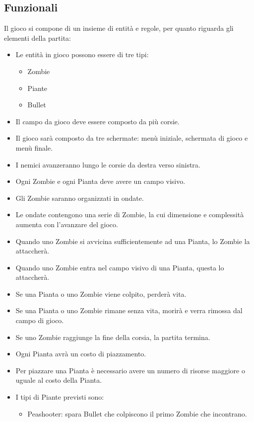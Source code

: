 \subsection{Funzionali}
Il gioco si compone di un insieme di entità e regole, per quanto riguarda gli elementi della partita:
\begin{itemize}
    \item Le entità in gioco possono essere di tre tipi:
    \begin{itemize}
        \item Zombie
        \item Piante
        \item Bullet
    \end{itemize}
    \item Il campo da gioco deve essere composto da più corsie.
    \item Il gioco sarà composto da tre schermate: menù iniziale, schermata di gioco e menù finale.
    \item I nemici avanzeranno lungo le corsie da destra verso sinistra.
    \item Ogni Zombie e ogni Pianta deve avere un campo visivo.
    \item Gli Zombie saranno organizzati in ondate.
    \item Le ondate contengono una serie di Zombie, la cui dimensione e complessità aumenta con l'avanzare del gioco.
    \item Quando uno Zombie si avvicina sufficientemente ad una Pianta, lo Zombie la attaccherà.
    \item Quando uno Zombie entra nel campo visivo di una Pianta, questa lo attaccherà.
    \item Se una Pianta o uno Zombie viene colpito, perderà vita.
    \item Se una Pianta o uno Zombie rimane senza vita, morirà e verra rimossa dal campo di gioco.
    \item Se uno Zombie raggiunge la fine della corsia, la partita termina.
    \item Ogni Pianta avrà un costo di piazzamento.
    \item Per piazzare una Pianta è necessario avere un numero di risorse maggiore o uguale al costo della Pianta.
    \item I tipi di Piante previsti sono:
    \begin{itemize}
        \item Peashooter: spara Bullet che colpiscono il primo Zombie che incontrano.
    \end{itemize}

\end{itemize}
